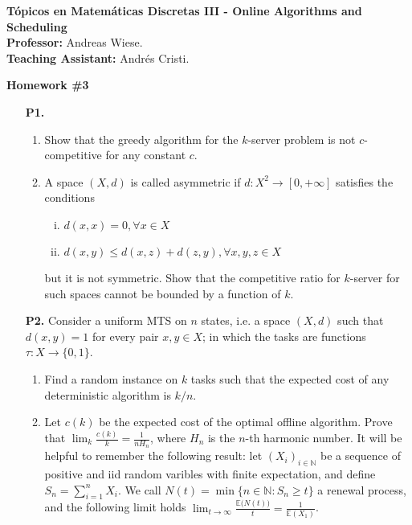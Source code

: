 \documentclass[11pt, spanish]{article}
\theoremstyle{plain}
\newcommand{\N}{\mathds{N}}
\newcommand{\E}{\mathbb{E}}
\begin{document}

\begin{flushleft}
  \textbf{Tópicos en Matemáticas Discretas III - Online Algorithms and Scheduling}
  \\\textbf{Professor:} Andreas Wiese.
  \\\textbf{Teaching Assistant:} Andrés Cristi.
\end{flushleft}


\begin{center}
  \Large{\textbf{Homework \#3}}
\end{center}




\begin{itemize}
  \item[\textbf{P1.}] 
    \begin{enumerate}
      \item Show that the greedy algorithm for the $k$-server problem
	is not $c$-competitive for any constant $c$.
      \item A space $(X,d)$ is called asymmetric if $d:X^2\rightarrow [0,+\infty]$
	satisfies the conditions
	\begin{enumerate}[i.]
	  \item $d(x,x)=0, \forall x\in X$
	  \item $d(x,y)\leq d(x,z)+d(z,y), \forall x,y,z\in X$
	\end{enumerate}
	but it is not symmetric. Show that
	the competitive ratio for $k$-server for such spaces cannot be bounded
	by a function of $k$.
    \end{enumerate}

  
  \item[\textbf{P2.}] Consider a uniform MTS on $n$ states, i.e. a space $(X,d)$ such
    that $d(x,y)=1$ for every pair $x,y\in X$; in which the tasks are functions $\tau:X\rightarrow \{0,1\}$.
    \begin{enumerate}
      \item Find a random instance on $k$ tasks such that the expected cost of any
	deterministic algorithm is $k/n$.
      \item Let $c(k)$ be the expected cost of the optimal offline algorithm.
	Prove that $\lim_k \frac{c(k)}{k}= \frac{1}{nH_n}$, where $H_n$ is 
	the $n$-th harmonic number. It will be helpful to remember the following result: let $(X_i)_{i\in\N}$ be a sequence of positive and iid random
	varibles with finite expectation, and define $S_n= \sum_{i=1}^n X_i$.
	We call $N(t)= \min \{ n\in \N: S_n\geq t \}$ a renewal process, and the
	following limit holds $\lim_{t\rightarrow\infty} \frac{\E\big(N(t)\big)}{t}= \frac{1}{\E(X_1)}$.
	

\end{enumerate}
\end{itemize}
\end{document}
